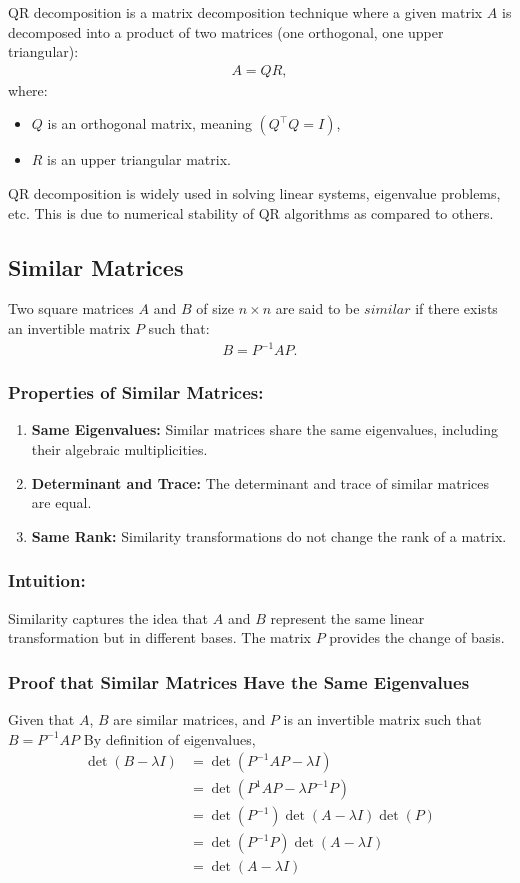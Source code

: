 \documentclass[12pt]{article}
\begin{document}
QR decomposition is a matrix decomposition technique where a given matrix $A$ is decomposed into a product of two matrices (one orthogonal, one upper triangular):
\begin{align*}
A = QR,
\end{align*}
where:
\begin{itemize}
    \item $Q$ is an orthogonal matrix, meaning $(Q^{\top} Q = I)$,
    \item $R$ is an upper triangular matrix.
\end{itemize}
QR decomposition is widely used in solving linear systems, eigenvalue problems, etc. This is due to numerical stability of QR algorithms as compared to others.
\subsection{Similar Matrices}
Two square matrices $A$ and $B$ of size $n \times n$ are said to be $similar$ if there exists an invertible matrix $P$ such that:
\begin{align*}
B = P^{-1} A P.
\end{align*}

\subsubsection{Properties of Similar Matrices:}
\begin{enumerate}
\item \textbf{Same Eigenvalues:} Similar matrices share the same eigenvalues, including their algebraic multiplicities.
\item \textbf{Determinant and Trace:} The determinant and trace of similar matrices are equal.
\item \textbf{Same Rank:} Similarity transformations do not change the rank of a matrix.
\end{enumerate}
\subsubsection{Intuition:}
Similarity captures the idea that $A$ and $B$ represent the same linear transformation but in different bases. The matrix $P$ provides the change of basis.
\subsubsection{Proof that Similar Matrices Have the Same Eigenvalues}
Given that $A$, $B$ are similar matrices, and $P$ is an invertible matrix such that $B=P^{-1}AP$
By definition of eigenvalues,
\begin{align*}
    \det(B-\lambda I)&=\det(P^{-1}AP -\lambda I)\\
    &=\det(P^{1}AP -\lambda P^{-1}P)\\
    &=\det(P^{-1})\det(A-\lambda I)\det(P)\\
    &=\det(P^{-1}P)\det(A- \lambda I)\\
    &=\det(A-\lambda I)
\end{align*}
\end{document}
